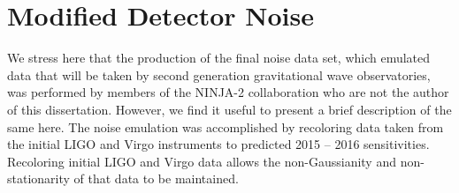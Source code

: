 \section{Modified Detector Noise}
\label{sec:noise}

We stress here that the production of the final noise data set, which emulated data
that will be taken by second generation gravitational wave observatories, 
was performed by members of the NINJA-2 collaboration who are not the author 
of this dissertation.  
However, we find it useful to present a brief description of the same here.
The noise emulation 
was accomplished by recoloring data taken from the initial LIGO and Virgo 
instruments to predicted 2015 -- 2016 sensitivities. Recoloring initial LIGO 
and 
Virgo data allows the non-Gaussianity and non-stationarity of that data to be 
maintained.


